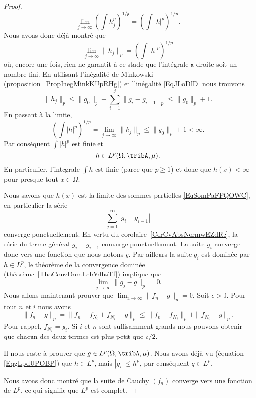 \begin{proof}
	\begin{equation}
		\lim_{j\to \infty} \left( \int h_j^p \right)^{1/p}=\left( \int | h |^p \right)^{1/p}.
	\end{equation}
	Nous avons donc déjà montré que
	\begin{equation}
		\lim_{j\to \infty} \| h_j \|_p=\left( \int | h |^p \right)^{1/p}
	\end{equation}
	où, encore une fois, rien ne garantit à ce stade que l'intégrale à droite soit un nombre fini. En utilisant l'inégalité de Minkowski (proposition~\ref{PropInegMinkKUpRHg}) et l'inégalité \eqref{EqJLoDID} nous trouvons
	\begin{equation}
		\|h_j\|_p\leq \|g_0\|_p+\sum_{i=1}^j\|g_i-g_{i-1}\|_p\leq \|g_0\|_p+1.
	\end{equation}
	En passant à la limite,
	\begin{equation}
		\left( \int| h |^p \right)^{1/p}=\lim_{j\to \infty}\|h_j\|_p \leq \|g_0\|_p+1<\infty.
	\end{equation}
	Par conséquent \( \int| h |^p\) est finie et
	\begin{equation}    \label{EqgLpdUPOBP}
		h\in L^p(\Omega,\tribA,\mu).
	\end{equation}
	En particulier, l'intégrale \( \int h\) est finie (parce que \( p\geq 1\)) et donc que \( h(x)<\infty\) pour presque tout \( x\in\Omega\).

	Nous savons que \( h(x)\) est la limite des sommes partielles \eqref{EqSomPaFPQOWC}, en particulier la série
	\begin{equation}
		\sum_{j=1}^{\infty}| g_i-g_{i-1} |
	\end{equation}
	converge ponctuellement. En vertu du corolaire~\ref{CorCvAbsNormwEZdRc}, la série de terme général \( g_i-g_{i-1}\) converge ponctuellement. La suite \( g_i\) converge donc vers une fonction que nous notons \( g\). Par ailleurs la suite \( g_i\) est dominée par \( h\in L^p\), le théorème de la convergence dominée (théorème~\ref{ThoConvDomLebVdhsTf}) implique que
	\begin{equation}
		\lim_{j\to \infty} \|g_j-g\|_p=0.
	\end{equation}
	Nous allons maintenant prouver que \( \lim_{n\to \infty}\|f_n-g\|_p =0\). Soit \( \epsilon>0\). Pour tout \( n\) et \( i\) nous avons
	\begin{equation}
		\|f_n-g\|_p=\|f_n-f_{N_i}+f_{N_i}-g\|_p\leq\|f_n-f_{N_i}\|_p+\|f_{N_i}-g\|_p.
	\end{equation}
	Pour rappel, \( f_{N_i}=g_i\). Si \(i\) et \( n\) sont suffisamment grands nous pouvons obtenir que chacun des deux termes est plus petit que \( \epsilon/2\).

	Il nous reste à prouver que \( g\in L^p(\Omega,\tribA,\mu)\). Nous avons déjà vu (équation \eqref{EqgLpdUPOBP}) que \( h\in L^p\), mais \( | g_i |\leq h^p\), par conséquent  \( g\in L^p\).

	Nous avons donc montré que la suite de Cauchy \( (f_n)\) converge vers une fonction de \( L^p\), ce qui signifie que \( L^p\) est complet.
\end{proof}

